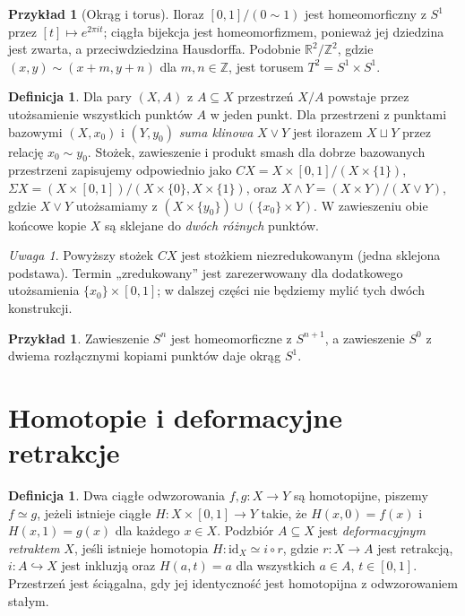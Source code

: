 \documentclass[11pt,a4paper,oneside]{report}
\newcommand{\R}{\mathbb{R}}
\newcommand{\Z}{\mathbb{Z}}
\newcommand{\id}{\mathrm{id}}
\theoremstyle{plain}
\theoremstyle{definition}
\newtheorem{definicja}[twierdzenie]{Definicja}
\newtheorem{przyklad}[twierdzenie]{Przykład}
\theoremstyle{remark}
\newtheorem{uwaga}[twierdzenie]{Uwaga}
\begin{document}
\begin{przyklad}[Okrąg i torus]
Iloraz $[0,1]/(0\sim1)$ jest homeomorficzny z $S^1$ przez
$[t]\mapsto e^{2\pi it}$; ciągła bijekcja jest homeomorfizmem, ponieważ
jej dziedzina jest zwarta, a przeciwdziedzina Hausdorffa.
Podobnie $\R^2/\Z^2$, gdzie $(x,y)\sim(x+m,y+n)$ dla $m,n\in\Z$,
jest torusem $T^2=S^1\times S^1$.
\end{przyklad}

\begin{definicja}
Dla pary $(X,A)$ z $A\subseteq X$ przestrzeń $X/A$ powstaje przez
utożsamienie wszystkich punktów $A$ w jeden punkt. Dla przestrzeni z
punktami bazowymi $(X,x_0)$ i $(Y,y_0)$ \emph{suma klinowa}
$X\vee Y$ jest ilorazem $X\sqcup Y$ przez relację $x_0\sim y_0$.
Stożek, zawieszenie i produkt smash dla dobrze bazowanych
przestrzeni zapisujemy odpowiednio jako
$CX=X\times[0,1]/(X\times\{1\})$,
$\Sigma X=(X\times[0,1])/(X\times\{0\},X\times\{1\})$,
oraz $X\wedge Y=(X\times Y)/(X\vee Y)$,
gdzie $X\vee Y$ utożsamiamy z
$(X\times\{y_0\})\cup(\{x_0\}\times Y)$.
W zawieszeniu obie końcowe kopie $X$ są sklejane do \emph{dwóch różnych}
punktów.
\end{definicja}

\begin{uwaga}
Powyższy stożek $CX$ jest stożkiem niezredukowanym (jedna sklejona
podstawa). Termin „zredukowany” jest zarezerwowany dla dodatkowego
utożsamienia $\{x_0\}\times[0,1]$; w dalszej części nie będziemy
mylić tych dwóch konstrukcji.
\end{uwaga}

\begin{przyklad}
Zawieszenie $S^n$ jest homeomorficzne z $S^{n+1}$, a zawieszenie $S^0$
z dwiema rozłącznymi kopiami punktów daje okrąg $S^1$.
\end{przyklad}

\section{Homotopie i deformacyjne retrakcje}

\begin{definicja}
Dwa ciągłe odwzorowania $f,g:X\to Y$ są homotopijne, piszemy
$f\simeq g$, jeżeli istnieje ciągłe $H:X\times[0,1]\to Y$ takie, że
$H(x,0)=f(x)$ i $H(x,1)=g(x)$ dla każdego $x\in X$.
Podzbiór $A\subseteq X$ jest \emph{deformacyjnym retraktem} $X$, jeśli
istnieje homotopia $H:\id_X\simeq i\circ r$, gdzie $r:X\to A$ jest
retrakcją, $i:A\hookrightarrow X$ jest inkluzją oraz
$H(a,t)=a$ dla wszystkich $a\in A$, $t\in[0,1]$.
Przestrzeń jest ściągalna, gdy jej identyczność jest homotopijna z
odwzorowaniem stałym.
\end{definicja}
\end{document}
